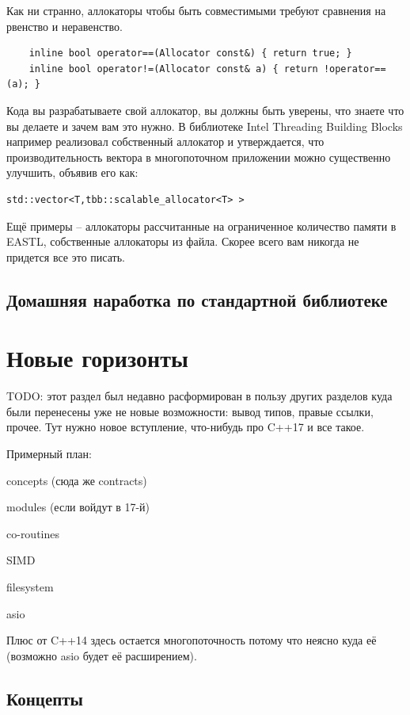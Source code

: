 \documentclass[a4paper,12pt,oneside]{article}
\begin{document}
Как ни странно, аллокаторы чтобы быть совместимыми требуют сравнения на рвенство и неравенство.

\begin{lstlisting}
    inline bool operator==(Allocator const&) { return true; }
    inline bool operator!=(Allocator const& a) { return !operator==(a); }
\end{lstlisting}

Кода вы разрабатываете свой аллокатор, вы должны быть уверены, что знаете что вы делаете и зачем вам это нужно. В библиотеке Intel Threading Building Blocks например реализовал собственный аллокатор и утверждается, что производительность вектора в многопоточном приложении можно существенно улучшить, объявив его как:

\begin{lstlisting}
std::vector<T,tbb::scalable_allocator<T> >
\end{lstlisting}

Ещё примеры -- аллокаторы рассчитанные на ограниченное количество памяти в EASTL, собственные аллокаторы из файла. Скорее всего вам никогда не придется все это писать.

\pagebreak
\subsection{Домашняя наработка по стандартной библиотеке}

\pagebreak
\section{Новые горизонты}

TODO: этот раздел был недавно расформирован в пользу других разделов куда были перенесены уже не новые возможности: вывод типов, правые ссылки, прочее. Тут нужно новое вступление, что-нибудь про C++17 и все такое.

Примерный план:

concepts (сюда же contracts)

modules (если войдут в 17-й)

co-routines

SIMD

filesystem

asio

Плюс от C++14 здесь остается многопоточность потому что неясно куда её (возможно asio будет её расширением).

\pagebreak
\subsection{Концепты}\label{Concepts}
\end{document}
